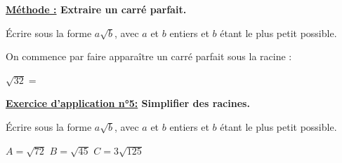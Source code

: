 \documentclass[12pt]{article}
\begin{document}
\vspace{5pt}
{\color{RedOrange}\textbf{\underline{Méthode :} Extraire un carré parfait.}}

\vspace{5pt}
Écrire sous la forme $a\sqrt{b}$, avec $a$ et $b$ entiers et $b$ étant le plus petit possible.

\vspace{5pt}
On commence par faire apparaître un carré parfait sous la racine :

\vspace{20pt}
\hspace{1cm}$\sqrt{32} = $

\vspace{2cm}

\begin{mdframed}[
    linewidth=1pt,
    roundcorner=5pt,
    linecolor=RoyalBlue,
    innertopmargin=10pt,
    innerbottommargin=10pt
]
{\color{RoyalBlue}
\textbf{\underline{Exercice d'application n°5:} Simplifier des racines.}}

\vspace{5pt}
Écrire sous la forme $a\sqrt{b}$, avec $a$ et $b$ entiers et $b$ étant le plus petit possible.

\vspace{5pt}
$A = \sqrt{72}$ \hspace{1cm} $B = \sqrt{45}$ \hspace{1cm} $C = 3\sqrt{125}$

\vspace{0.5cm}
{\color{black!30}\dotfill}

\vspace{0.5cm}
{\color{black!30}\dotfill}

\vspace{0.5cm}
{\color{black!30}\dotfill}

\vspace{0.5cm}
{\color{black!30}\dotfill}

\vspace{0.5cm}
{\color{black!30}\dotfill}

\vspace{0.5cm}
{\color{black!30}\dotfill}

\vspace{0.5cm}
{\color{black!30}\dotfill}

\vspace{0.5cm}
{\color{black!30}\dotfill}

\vspace{20pt}

\end{mdframed}
\end{document}
